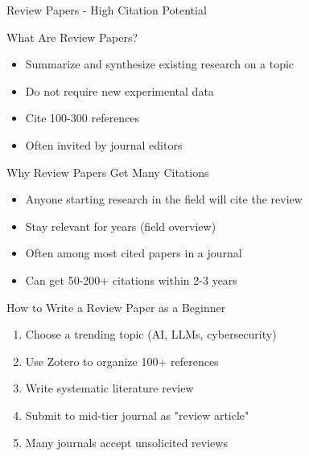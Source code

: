 \documentclass[11pt]{beamer}
\begin{document}
	\begin{frame}{Review Papers - High Citation Potential}
		\scriptsize
		\begin{block}{What Are Review Papers?}
			\begin{itemize}
				\item Summarize and synthesize existing research on a topic
				\item Do not require new experimental data
				\item Cite 100-300 references
				\item Often invited by journal editors
			\end{itemize}
		\end{block}
		\begin{block}{Why Review Papers Get Many Citations}
			\begin{itemize}
				\item Anyone starting research in the field will cite the review
				\item Stay relevant for years (field overview)
				\item Often among most cited papers in a journal
				\item Can get 50-200+ citations within 2-3 years
			\end{itemize}
		\end{block}
		\begin{block}{How to Write a Review Paper as a Beginner}
			\begin{enumerate}
				\item Choose a trending topic (AI, LLMs, cybersecurity)
				\item Use Zotero to organize 100+ references
				\item Write systematic literature review
				\item Submit to mid-tier journal as "review article"
				\item Many journals accept unsolicited reviews
			\end{enumerate}
		\end{block}
	\end{frame}
	
\end{document}
